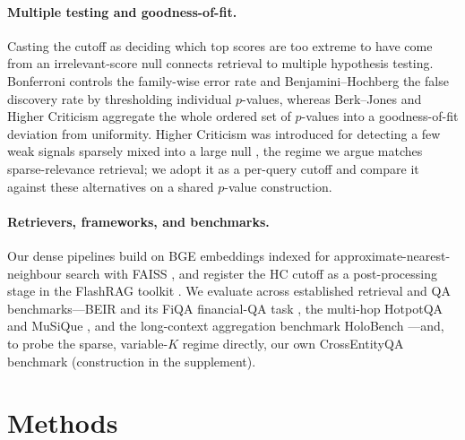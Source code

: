 \documentclass[letterpaper]{article} %
\begin{document}
\paragraph{Multiple testing and goodness-of-fit.} Casting the cutoff as
deciding which top scores are too extreme to have come from an irrelevant-score
null connects retrieval to multiple hypothesis testing. Bonferroni
\citep{bonferroni1961dunn} controls the family-wise error rate and
Benjamini--Hochberg \citep{benjamini1995fdr} the false discovery rate by
thresholding individual $p$-values, whereas Berk--Jones \citep{berkjones1979}
and Higher Criticism \citep{donohojin2004hc} aggregate the whole ordered set of
$p$-values into a goodness-of-fit deviation from uniformity. Higher Criticism
was introduced for detecting a few weak signals sparsely mixed into a large
null \citep{donohojin2004hc}, the regime we argue matches sparse-relevance
retrieval; we adopt it as a per-query cutoff and compare it against these
alternatives on a shared $p$-value construction.

\paragraph{Retrievers, frameworks, and benchmarks.} Our dense pipelines build
on BGE embeddings \citep{bgeembeddings2023} indexed for
approximate-nearest-neighbour search with FAISS \citep{johnson2019faiss}, and
register the HC cutoff as a post-processing stage in the FlashRAG toolkit
\citep{jin2025flashrag}. We evaluate across established retrieval and QA
benchmarks---BEIR and its FiQA financial-QA task \citep{thakur2021beir}, the
multi-hop HotpotQA \citep{yang2018hotpotqa} and MuSiQue
\citep{trivedi2022musique}, and the long-context aggregation benchmark
HoloBench \citep{maekawa2024holobench}---and, to probe the sparse,
variable-$K$ regime directly, our own CrossEntityQA benchmark (construction in
the supplement).

\section{Methods}
\end{document}
